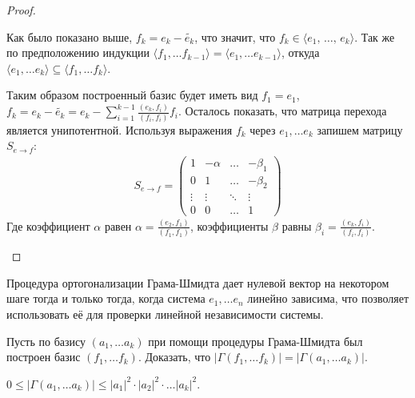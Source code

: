 \begin{proof}
\begin{enumerate}
\begin{enumerate}
            Как было показано выше, $f_k = e_k - \tilde{e_k}$, что значит, что $f_k \in \langle e_1, 
            \, \dots, \, e_k \rangle$. Так же по предположению индукции $\langle f_1, \dots f_{k-1} \rangle = 
            \langle e_1, \dots e_{k-1} \rangle$, откуда $\langle e_1, \dots e_{k} \rangle \subseteq 
            \langle f_1, \dots f_{k} \rangle$.
        \end{enumerate}
        Таким образом построенный базис будет иметь вид $f_1 = e_1$, $f_k = e_k - \tilde{e_k} = 
        e_k - \displaystyle\sum_{i=1}^{k-1} \frac{(e_k, f_i)}{(f_i, f_i)}f_i$. Осталось показать, что 
        матрица перехода является унипотентной. Используя выражения $f_k$ через $e_1, \dots e_k$ запишем 
        матрицу $S_{e \to f}$:
        \begin{gather*}
            S_{e \to f} = \begin{pmatrix}
            1      & -\alpha & \dots  & -\beta_1   \\
            0      & 1       & \dots  & -\beta_2   \\
            \vdots & \vdots  & \ddots & \vdots     \\
            0      & 0       & \dots  & 1
            \end{pmatrix}
        \end{gather*}
        Где коэффициент $\alpha$ равен $\alpha = \frac{(e_2, f_1)}{(f_1, f_1)}$, коэффициенты $\beta$
        равны $\beta_i = \frac{(e_k, f_i)}{(f_i, f_i)}$.
    \end{enumerate}
\end{proof}

\begin{note}
    Процедура ортогонализации Грама-Шмидта дает нулевой вектор на некотором шаге тогда и только тогда, 
    когда система $e_1, \dots e_n$ линейно зависима, что позволяет использовать её для проверки линейной
    независимости системы.
\end{note}

\begin{exercise}
    Пусть по базису $(a_1, \dots a_k)$ при помощи процедуры Грама-Шмидта был построен базис $(f_1, \dots f_k)$.
    Доказать, что $|\Gamma(f_1, \dots f_k)| = |\Gamma(a_1, \dots a_k)|$.
\end{exercise}

\begin{corollary}
    $0 \leq |\Gamma(a_1, \dots a_k)| \leq |a_1|^2 \cdot |a_2|^2 \cdot \dots |a_k|^2$.
\end{corollary}


